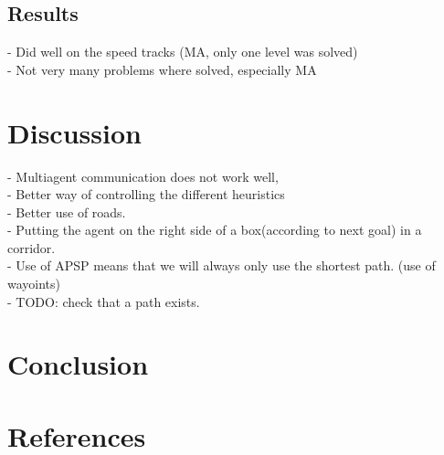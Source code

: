 \documentclass{article}
\begin{document}
\subsection{Results}
- Did well on the speed tracks (MA, only one level was solved)\\
- Not very many problems where solved, especially MA\\
\section{Discussion}
- Multiagent communication does not work well,\\
- Better way of controlling the different heuristics\\
- Better use of roads.\\
- Putting the agent on the right side of a box(according to next goal) in a corridor.\\
- Use of APSP means that we will always only use the shortest path. (use of wayoints)\\
- TODO: check that a path exists.\\
\section{Conclusion}
\section{References}
\end{document}
